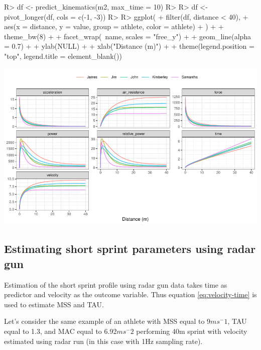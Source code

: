 \documentclass[
]{jss}
\begin{document}
\begin{CodeChunk}
\begin{CodeInput}
R> df <- predict_kinematics(m2, max_time = 10)
R> 
R> df <- pivot_longer(df, cols = c(-1, -3))
R> 
R> ggplot(
+   filter(df, distance < 40),
+   aes(x = distance, y = value, group = athlete, color = athlete)
+ ) +
+   theme_bw(8) +
+   facet_wrap(~name, scales = "free_y") +
+   geom_line(alpha = 0.7) +
+   ylab(NULL) +
+   xlab("Distance (m)") +
+   theme(legend.position = "top", legend.title = element_blank())
\end{CodeInput}


\begin{center}\includegraphics[width=1\linewidth]{paper_files/figure-latex/unnamed-chunk-12-1} \end{center}

\end{CodeChunk}

\hypertarget{estimating-short-sprint-parameters-using-radar-gun}{%
\subsection{Estimating short sprint parameters using radar gun}\label{estimating-short-sprint-parameters-using-radar-gun}}

Estimation of the short sprint profile using radar gun data takes time as predictor and velocity as the outcome variable. Thus equation \eqref{eq:velocity-time} is used to estimate MSS and TAU.

Let's consider the same example of an athlete with MSS equal to 9\(ms^-1\), TAU equal to 1.3, and MAC equal to 6.92\(ms^-2\) performing 40m sprint with velocity estimated using radar run (in this case with 1Hz sampling rate).
\end{document}
